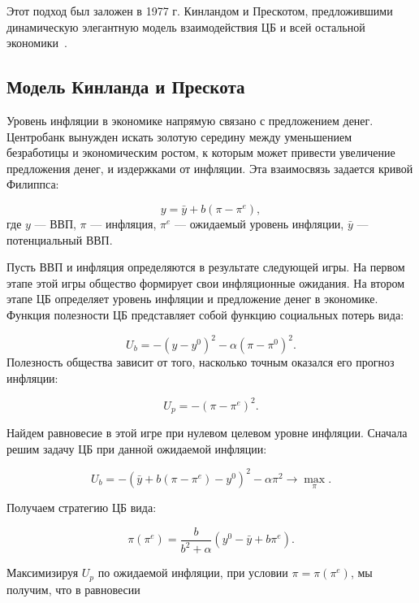 \documentclass[14pt,a4paper, oneside]{extreport}
\theoremstyle{plain}              %
\theoremstyle{definition}         %
\begin{document}
Этот подход был заложен в 1977 г. Кинландом и Прескотом, предложившими динамическую элегантную модель взаимодействия ЦБ и всей остальной экономики~\cite{kydland1977rules}. 

\subsection{Модель Кинланда и Прескота}

Уровень инфляции в экономике напрямую связано с предложением денег. Центробанк вынужден искать золотую середину между уменьшением безработицы и экономическим ростом, к которым может привести увеличение предложения денег, и  издержками от инфляции. Эта взаимосвязь задается кривой Филиппса:

\begin{equation}\label{T3-1}
y = \bar y + b(\pi-\pi^e),
\end{equation}
где $y$ --- ВВП, $\pi$ --- инфляция, $\pi^e$ --- ожидаемый уровень инфляции, $\bar y$ --- потенциальный ВВП.
 
Пусть ВВП и инфляция определяются в результате следующей игры. На первом этапе этой игры общество формирует свои инфляционные ожидания. На втором этапе ЦБ определяет уровень инфляции и предложение денег в экономике. 
Функция полезности ЦБ представляет собой функцию социальных потерь вида:

\begin{equation}\label{T3-2}
U_b = -(y - y^0)^2 - \alpha (\pi - \pi^0)^2.
\end{equation}
Полезность общества зависит от того, насколько точным оказался его прогноз инфляции:

\begin{equation}\label{T3-3}
U_p = -(\pi - \pi^e)^2.
\end{equation}

Найдем равновесие в этой игре при нулевом целевом уровне инфляции. Сначала решим задачу ЦБ при данной ожидаемой инфляции:

\begin{equation}\label{T3-4}
U_b = - (\bar y + b(\pi - \pi^e) - y^0)^2 - \alpha \pi^2 \to \max_\pi.
\end{equation}

Получаем стратегию ЦБ вида:

\begin{equation}\label{T3-5}
\pi(\pi^e)=\frac{b}{b^2+\alpha} (y^0- \bar y + b \pi^e).
\end{equation}

Максимизируя $U_p$ по ожидаемой инфляции, при условии  $\pi=\pi(\pi^e)$, мы получим, что в равновесии 
\end{document}
